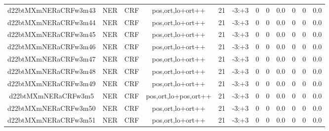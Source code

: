 \documentclass[a4paper]{article}
\begin{document}
\begin{landscape}
\begin{center}
\begin{tabular}{ |c|c|c|c|c|c|c|c|c|c|c|c|}
 
 	
 	\small{ d22btMXmNERaCRFw3m43 } & \small{ NER} & \small{  CRF }  & pos,ort,lo+ort++  &  21 &  \small{  -3:+3 }  &  0 & 0 & 0.0  &  0 & 0 & 0.0 \\
 	

 
 	
 	\small{ d22btMXmNERaCRFw3m44 } & \small{ NER} & \small{  CRF }  & pos,ort,lo+ort++  &  21 &  \small{  -3:+3 }  &  0 & 0 & 0.0  &  0 & 0 & 0.0 \\
 	

 
 	
 	\small{ d22btMXmNERaCRFw3m45 } & \small{ NER} & \small{  CRF }  & pos,ort,lo+ort++  &  21 &  \small{  -3:+3 }  &  0 & 0 & 0.0  &  0 & 0 & 0.0 \\
 	

 
 	
 	\small{ d22btMXmNERaCRFw3m46 } & \small{ NER} & \small{  CRF }  & pos,ort,lo+ort++  &  21 &  \small{  -3:+3 }  &  0 & 0 & 0.0  &  0 & 0 & 0.0 \\
 	

 
 	
 	\small{ d22btMXmNERaCRFw3m47 } & \small{ NER} & \small{  CRF }  & pos,ort,lo+ort++  &  21 &  \small{  -3:+3 }  &  0 & 0 & 0.0  &  0 & 0 & 0.0 \\
 	

 
 	
 	\small{ d22btMXmNERaCRFw3m48 } & \small{ NER} & \small{  CRF }  & pos,ort,lo+ort++  &  21 &  \small{  -3:+3 }  &  0 & 0 & 0.0  &  0 & 0 & 0.0 \\
 	

 
 	
 	\small{ d22btMXmNERaCRFw3m49 } & \small{ NER} & \small{  CRF }  & pos,ort,lo+ort++  &  21 &  \small{  -3:+3 }  &  0 & 0 & 0.0  &  0 & 0 & 0.0 \\
 	

 
 	
 	\small{ d22btMXmNERaCRFw3m5 } & \small{ NER} & \small{  CRF }  & pos,ort,lo+pos,ort++  &  21 &  \small{  -3:+3 }  &  0 & 0 & 0.0  &  0 & 0 & 0.0 \\
 	

 
 	
 	\small{ d22btMXmNERaCRFw3m50 } & \small{ NER} & \small{  CRF }  & pos,ort,lo+ort++  &  21 &  \small{  -3:+3 }  &  0 & 0 & 0.0  &  0 & 0 & 0.0 \\
 	

 
 	
 	\small{ d22btMXmNERaCRFw3m51 } & \small{ NER} & \small{  CRF }  & pos,ort,lo+ort++  &  21 &  \small{  -3:+3 }  &  0 & 0 & 0.0  &  0 & 0 & 0.0 \\
 	


\end{tabular}
\end{center}
\end{landscape}
\end{document}
